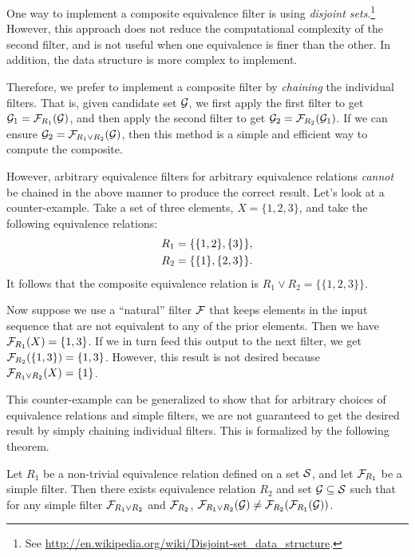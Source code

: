 One way to implement a composite equivalence filter is using \emph{disjoint sets}.\footnote{See \url{http://en.wikipedia.org/wiki/Disjoint-set\_data\_structure}.} However, this approach does not reduce the computational complexity of the second filter, and is not useful when one equivalence is finer than the other. In addition, the data structure is more complex to implement.

Therefore, we prefer to implement a composite filter by \emph{chaining} the individual filters. That is, given candidate set $\mathcal{G}$, we first apply the first filter to get $\mathcal{G}_1 = \mathcal{F}_{R_1}(\mathcal{G})$, and then apply the second filter to get $\mathcal{G}_2 = \mathcal{F}_{R_2}(\mathcal{G}_1)$. If we can ensure $\mathcal{G}_2 = \mathcal{F}_{R_1 \vee R_2}(\mathcal{G})$, then this method is a simple and efficient way to compute the composite.

However, arbitrary equivalence filters for arbitrary equivalence relations \emph{cannot} be chained in the above manner to produce the correct result. Let's look at a counter-example. Take a set of three elements, $X = \{1, 2, 3\}$, and take the following equivalence relations:
\begin{align}
R_1 &= \{ \{1, 2\}, \{3\}  \} , \notag \\
R_2 &= \{ \{1\}, \{2,3\}  \} . \notag 
\end{align}
It follows that the composite equivalence relation is $R_1 \vee R_2 = \{ \{ 1, 2, 3 \} \}$.

Now suppose we use a ``natural'' filter $\mathcal{F}$ that keeps elements in the input sequence that are not equivalent to any of the prior elements. Then we have $\mathcal{F}_{R_1}(X) = \{ 1, 3 \}$. If we in turn feed this output to the next filter, we get $\mathcal{F}_{R_2}(\{1,3\}) = \{1,3 \}$. However, this result is not desired because $\mathcal{F}_{R_1 \vee R_2}(X) = \{1\}$.

This counter-example can be generalized to show that for arbitrary choices of equivalence relations and simple filters, we are not guaranteed to get the desired result by simply chaining individual filters. This is formalized by the following theorem.

\begin{theorem}
Let $R_1$ be a non-trivial equivalence relation defined on a set $\mathcal{S}$, and let $\mathcal{F}_{R_1}$ be a simple filter. Then there exists equivalence relation $R_2$ and set $\mathcal{G} \subseteq \mathcal{S}$ such that for any simple filter $\mathcal{F}_{R_1 \vee R_2}$ and $\mathcal{F}_{R_2}$, $\mathcal{F}_{R_1 \vee R_2}(\mathcal{G}) \ne \mathcal{F}_{R_2}(\mathcal{F}_{R_1}(\mathcal{G}))$.
\end{theorem}

